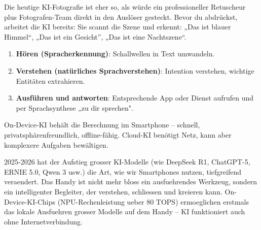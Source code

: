 


Die heutige KI-Fotografie ist eher so, als würde ein professioneller Retuscheur plus Fotografen-Team direkt in den Auslöser gesteckt. Bevor du abdrückst, arbeitet die KI bereits: Sie scannt die Szene und erkennt: „Das ist blauer Himmel“, „Das ist ein Gesicht”, „Das ist eine Nachtszene“.


\begin{enumerate}
  \item \textbf{Hören (Spracherkennung)}: Schallwellen in Text umwandeln.
  \item \textbf{Verstehen (natürliches Sprachverstehen)}: Intention verstehen, wichtige Entitäten extrahieren.
  \item \textbf{Ausführen und antworten}: Entsprechende App oder Dienst aufrufen und per Sprachsynthese „zu dir sprechen".
\end{enumerate}


On-Device-KI behält die Berechnung im Smartphone – schnell, privatsphärenfreundlich, offline-fähig. Cloud-KI benötigt Netz, kann aber komplexere Aufgaben bewältigen.


2025-2026 hat der Aufstieg grosser KI-Modelle (wie DeepSeek R1, ChatGPT-5, ERNIE 5.0, Qwen 3 usw.) die Art, wie wir Smartphones nutzen, tiefgreifend veraendert. Das Handy ist nicht mehr bloss ein ausfuehrendes Werkzeug, sondern ein intelligenter Begleiter, der verstehen, schliessen und kreieren kann. On-Device-KI-Chips (NPU-Rechenleistung ueber 80 TOPS) ermoeglichen erstmals das lokale Ausfuehren grosser Modelle auf dem Handy – KI funktioniert auch ohne Internetverbindung.


